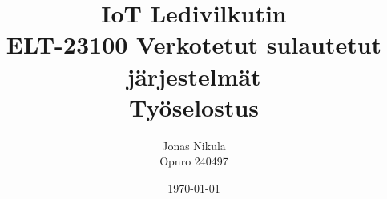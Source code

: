 \documentclass{article}
\title{IoT Ledivilkutin \\ ELT-23100 Verkotetut sulautetut järjestelmät \\ Työselostus} %
\author{Jonas Nikula \\ Opnro 240497} %
\date{\today} %
\begin{document}
\maketitle %





\printbibliography{}

\end{document}

